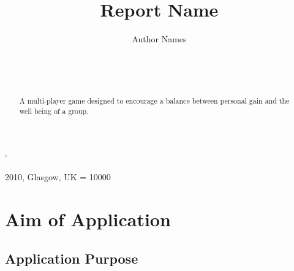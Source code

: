`\documentclass{sig-alt-release2}
\begin{document}
\newcommand{\todo}[1]{\textcolor{red}{#1}}
\def\newblock{\hskip .11em plus .33em minus .07em}

 {2010, Glasgow, UK} 
\widowpenalty = 10000

\title{{Report Name}}

\author{
\alignauthor
Author Names\\
	   \\
      \\
      \\
}
\maketitle

\begin{abstract}
A multi-player game designed to encourage a balance between personal gain and the well being of a group.

\end{abstract}

\section{Aim of Application}

\subsection{Application Purpose}
\end{document}
